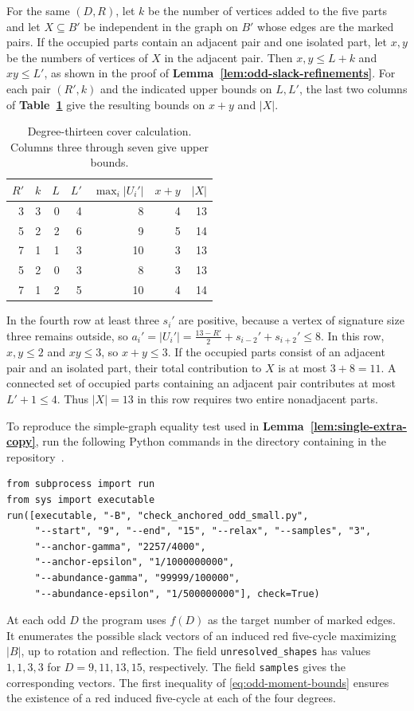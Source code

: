 \documentclass[preprint,11pt,numbers]{elsarticle-arxiv}
\numberwithin{equation}{section}
\theoremstyle{definition}
\begin{document}
For the same $(D,R)$, let $k$ be the number of vertices added to
the five parts and let $X\subseteq B'$ be independent in the graph
on $B'$ whose edges are the marked pairs. If the occupied parts contain an adjacent pair and
one isolated part, let $x,y$ be the numbers of vertices of $X$ in
the adjacent pair. Then $x,y\le L+k$ and $xy\le L'$, as shown in
the proof of \textbf{Lemma~\ref{lem:odd-slack-refinements}}.
For each pair $(R',k)$ and the indicated upper bounds on $L,L'$, the
last two columns of \textbf{Table~\ref{tab:thirteen-cover-check}} give
the resulting bounds on $x+y$ and $|X|$.
\begin{table}[H]
\centering
\begin{tabular}{@{}rrrrrrr@{}}
\toprule
$R'$ & $k$ & $L$ & $L'$ & $\max_i|U_i'|$ & $x+y$ & $|X|$\\
\midrule
3&3&0&4&8&4&13\\
5&2&2&6&9&5&14\\
7&1&1&3&10&3&13\\
5&2&0&3&8&3&13\\
7&1&2&5&10&4&14\\
\bottomrule
\end{tabular}
\caption{Degree-thirteen cover calculation. Columns three through
seven give upper bounds.}
\label{tab:thirteen-cover-check}
\end{table}
In the fourth row at least three $s_i'$ are positive, because a
vertex of signature size three remains outside, so
$a_i'=|U_i'|=\frac{13-R'}{2}+s_{i-2}'+s_{i+2}'\le8$.
In this row, $x,y\le2$ and $xy\le3$, so
$x+y\le3$. If the occupied parts consist of an adjacent pair and
an isolated part, their total contribution to $X$ is at most
$3+8=11$. A connected set of occupied parts containing an adjacent
pair contributes at most $L'+1\le4$. Thus $|X|=13$ in this row
requires two entire nonadjacent parts.

\noindent\begin{minipage}{\linewidth}
To reproduce the simple-graph equality test used in
\textbf{Lemma~\ref{lem:single-extra-copy}}, run the following Python
commands in the directory containing 
in the repository~\cite{FGSTCode}.
\begin{verbatim}
from subprocess import run
from sys import executable
run([executable, "-B", "check_anchored_odd_small.py",
     "--start", "9", "--end", "15", "--relax", "--samples", "3",
     "--anchor-gamma", "2257/4000",
     "--anchor-epsilon", "1/1000000000",
     "--abundance-gamma", "99999/100000",
     "--abundance-epsilon", "1/500000000"], check=True)
\end{verbatim}
\end{minipage}\par
At each odd $D$ the program uses $f(D)$ as the target number of marked
edges. It enumerates the possible slack vectors of an induced red
five-cycle maximizing $|B|$, up to rotation and reflection.
The field \texttt{unresolved\_shapes} has values
$1,1,3,3$ for $D=9,11,13,15$, respectively. The field
\texttt{samples} gives the corresponding vectors. The first
inequality of \eqref{eq:odd-moment-bounds} ensures the existence
of a red induced five-cycle at each of the four degrees.
\end{document}
